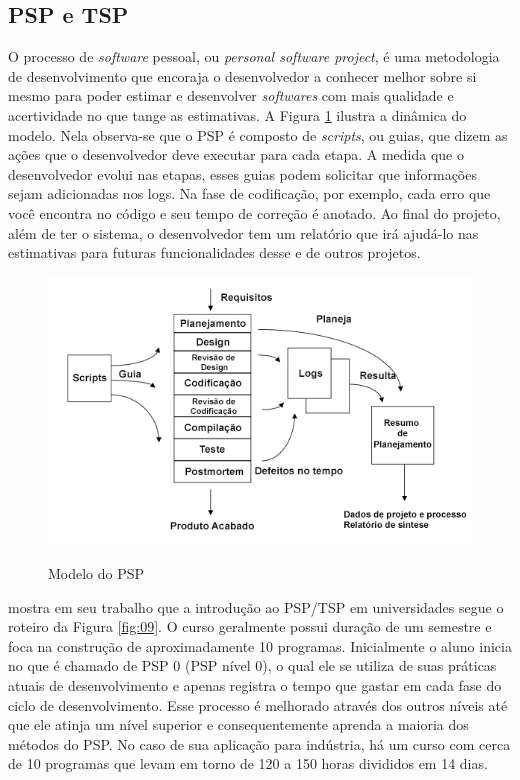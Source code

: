 \subsection{PSP e TSP}

O processo de \textit{software} pessoal, ou \textit{personal software project}, é uma metodologia de desenvolvimento que encoraja o desenvolvedor a conhecer melhor sobre si mesmo para poder estimar e desenvolver \textit{softwares} com mais qualidade e acertividade no que tange as estimativas. A Figura \ref{fig:08} ilustra a dinâmica do modelo. Nela observa-se que o PSP é composto de \textit{scripts}, ou guias, que dizem as ações que o desenvolvedor deve executar para cada etapa. A medida que o desenvolvedor evolui nas etapas, esses guias podem solicitar que informações sejam adicionadas nos logs. Na fase de codificação, por exemplo, cada erro que você encontra no código e seu tempo de correção é anotado. Ao final do projeto, além de ter o sistema, o desenvolvedor tem um relatório que irá ajudá-lo nas estimativas para futuras funcionalidades desse e de outros projetos. \cite{humphrey:00}

\begin{figure}[htb!]
\begin{center}
\caption{Modelo do PSP}
\label{fig:08}
\includegraphics[width=13cm]{assets/psp} \\
\end{center}
\end{figure}

 mostra em seu trabalho que a introdução ao PSP/TSP em universidades segue o roteiro da Figura \ref{fig:09}. O curso geralmente possui duração de um semestre e foca na construção de aproximadamente 10 programas. Inicialmente o aluno inicia no que é chamado de PSP 0 (PSP nível 0), o qual ele se utiliza de suas práticas atuais de desenvolvimento e apenas registra o tempo que gastar em cada fase do ciclo de desenvolvimento. Esse processo é melhorado através dos outros níveis até que ele atinja um nível superior e consequentemente aprenda a maioria dos métodos do PSP. No caso de sua aplicação para indústria, há um curso com cerca de 10 programas que levam em torno de 120 a 150 horas divididos em 14 dias.

